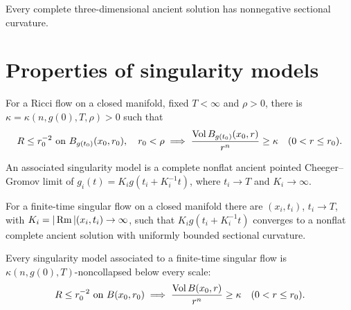 \begin{theorem}
\label{thm:chow-iv-ancient-3d-sectional}
Every complete three-dimensional ancient solution has nonnegative sectional
curvature.
\end{theorem}

\section{Properties of singularity models}

\begin{theorem}
\label{thm:chow-iv-no-local-collapsing}
For a Ricci flow on a closed manifold, fixed \(T<\infty\) and \(\rho>0\),
there is \(\kappa=\kappa(n,g(0),T,\rho)>0\) such that
\[
R\le r_0^{-2}\text{ on }B_{g(t_0)}(x_0,r_0),\quad r_0<\rho
\implies
\frac{\operatorname{Vol} B_{g(t_0)}(x_0,r)}{r^n}\ge\kappa\quad(0<r\le r_0).
\]
\end{theorem}

\begin{definition}
\label{def:chow-iv-finite-time-singularity-model}
An associated singularity model is a complete nonflat ancient pointed
Cheeger--Gromov limit of \(g_i(t)=K_i g(t_i+K_i^{-1}t)\), where
\(t_i\to T\) and \(K_i\to\infty\).
\end{definition}

\begin{theorem}
\label{thm:chow-iv-existence-singularity-models}
For a finite-time singular flow on a closed manifold there are
\((x_i,t_i)\), \(t_i\to T\), with \(K_i=|\operatorname{Rm}|(x_i,t_i)\to\infty\), such that
\(K_i g(t_i+K_i^{-1}t)\) converges to a nonflat complete ancient solution
with uniformly bounded sectional curvature.
\end{theorem}

\begin{theorem}
\label{thm:chow-iv-singularity-models-noncollapsed}
Every singularity model associated to a finite-time singular flow is
\(\kappa(n,g(0),T)\)-noncollapsed below every scale:
\[
R\le r_0^{-2}\text{ on }B(x_0,r_0)\implies
\frac{\operatorname{Vol} B(x_0,r)}{r^n}\ge\kappa\quad(0<r\le r_0).
\]
\end{theorem}

